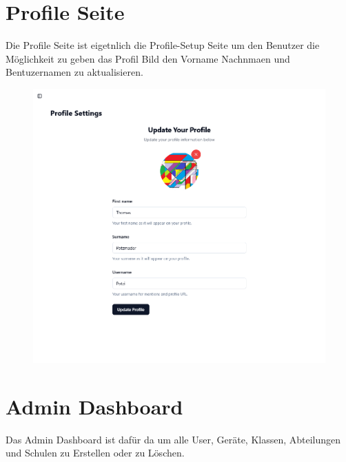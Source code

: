 \begin{inhalt}
\begin{enumerate}[label=\textbf{\arabic*.}]
\newpage

\section{Profile Seite}

Die Profile Seite ist eigetnlich die Profile-Setup Seite um den Benutzer die Möglichkeit zu geben das Profil Bild den Vorname Nachnmaen und Bentuzernamen zu aktualisieren.


\begin{figure}[!htb]
\centering
\includegraphics[width=1\textwidth]{files/Thomas/pics/Website/Profile/profile-screen.png}
\caption[Bildbezeichnung für Abbildungsverzeichnis]{}
\label{fig:gehaeuse_internet_bild}
\end{figure}

\newpage

\section{Admin Dashboard}

Das Admin Dashboard ist dafür da um alle User, Geräte, Klassen, Abteilungen und Schulen zu Erstellen oder zu Löschen. 


\end{enumerate}
\end{inhalt}
